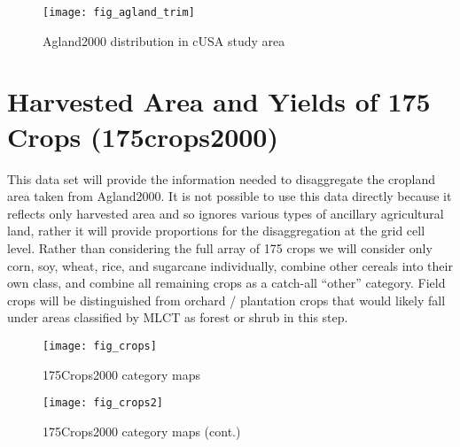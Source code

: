 \begin{figure}[hpt]
\centering
  


\texttt{[image: fig\_agland\_trim]}
 
\caption{Agland2000 distribution in cUSA study area}
\label{fig:agland} 
\end{figure} 


\section{Harvested Area and Yields of 175 Crops (175crops2000)}
\label{sec:175crops2000}

\citet{Monfreda2008}




This data set will provide the information needed to disaggregate the
cropland area taken from Agland2000.  It is not possible to use this
data directly because it reflects only harvested area and so ignores
various types of ancillary agricultural land, rather it will provide
proportions for the disaggregation at the grid cell level.  Rather
than considering the full array of 175 crops we will consider only
corn, soy, wheat, rice, and sugarcane individually, combine other
cereals into their own class, and combine all remaining crops as a
catch-all ``other'' category.  Field crops will be distinguished from
orchard / plantation crops that would likely fall under areas
classified by MLCT as forest or shrub in this step.



\begin{figure}[hpt] 
  \centering


\texttt{[image: fig\_crops]}
\caption{175Crops2000 category maps} 
\label{fig:crops} 
\end{figure} 


\begin{figure}[hpt] 
  \centering


\texttt{[image: fig\_crops2]}
\caption{175Crops2000 category maps (cont.)} 
\label{fig:crops2} 
\end{figure} 


